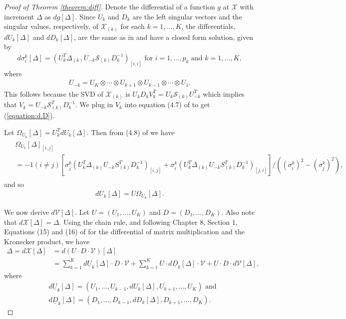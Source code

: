 \begin{proof}[Proof of Theorem \ref{theorem:diff}]
  Denote the differential of a function $g$ at $\mathcal{X}$ with
  increment $\Delta$ as $dg[\Delta]$. Since $U_k$ and $D_k$ are the
  left singular vectors and the singular values, respectively, of
  $\mathcal{X}_{(k)}$ for each $k = 1,\ldots,K$, the differentials,
  $dU_k[\Delta]$ and $dD_k[\Delta]$, are the same as in
  \cite{candes2013unbiased} and have a closed form solution, given by
  \begin{align}
    \label{equation:d.D}
    d\sigma_i^k[\Delta] = (U_k^T\Delta_{(k)}U_{-k}\mathcal{S}_{(k)}D_k^{-1})_{[i,i]} \text{ for } i =1,\ldots,p_k \text{ and } k=1,\ldots,K,
  \end{align}
  where
  \begin{align*}
    U_{-k} = U_K\otimes \cdots \otimes U_{k+1} \otimes U_{k-1}\otimes\cdots\otimes U_1.
  \end{align*}
  This follows because the SVD of $\mathcal{X}_{(k)}$ is $U_kD_kV_k^T
  = U_k\mathcal{S}_{(k)}U_{-k}^T$ which implies that $V_k =
  U_{-k}\mathcal{S}_{(k)}^TD_{k}^{-1}$. We plug in $V_k$ into equation
  (4.7) of \cite{candes2013unbiased} to get (\ref{equation:d.D}).

  Let $\Omega_{U_k}[\Delta] = U_k^TdU_k[\Delta]$. Then from (4.8) of
  \cite{candes2013unbiased} we have
  \begin{align}
    \begin{split}
      \label{equation:d.omega}
      &\Omega_{U_k}[\Delta]_{[i,j]} \\
      &= - 1(i \neq j)\left[\sigma_j^k(U_k^T\Delta_{(k)}U_{-k}S_{(k)}^TD_k^{-1})_{[i,j]} + \sigma_i^k(U_k^T\Delta_{(k)}U_{-k}S_{(k)}^TD_k^{-1})_{[j,i]}\right]/((\sigma_i^k)^2 - (\sigma_j^k)^2),
    \end{split}
  \end{align}
  and so
  \begin{align}
    \label{equation:d.U}
    dU_k[\Delta] = U\Omega_{U_k}[\Delta].
  \end{align}

  We now derive $d\mathcal{V}[\Delta]$. Let $U = (U_1,\ldots,U_K)$ and
  $D = (D_1,\ldots,D_K)$. Also note that $d\mathcal{X}[\Delta] =
  \Delta$. Using the chain rule, and following Chapter 8, Section 1,
  Equations (15) and (16) of \cite{magnus1999matrix} for the
  differential of matrix multiplication and the Kronecker product, we
  have
  \begin{align}
    \Delta = d\mathcal{X}[\Delta] &= d(U\cdot D \cdot\mathcal{V})[\Delta] \nonumber\\
    &=\sum_{k=1}^Kd\underline{U}_k[\Delta] \cdot D \cdot \mathcal{V} + \sum_{k=1}^K U \cdot d\underline{D}_k[\Delta] \cdot \mathcal{V} + U \cdot D \cdot d\mathcal{V}[\Delta], \label{equation:chain.rule}
  \end{align}
  where
  \begin{align}
    &d\underline{U}_k[\Delta] = (U_1,\ldots,U_{k-1},dU_k[\Delta],U_{k+1},\ldots,U_K) \text{ and} \label{equation:U.underline}\\
    &d\underline{D}_k[\Delta] = (D_1,\ldots,D_{k-1},dD_k[\Delta],D_{k+1},\ldots,D_K).
  \end{align}


\end{proof}
